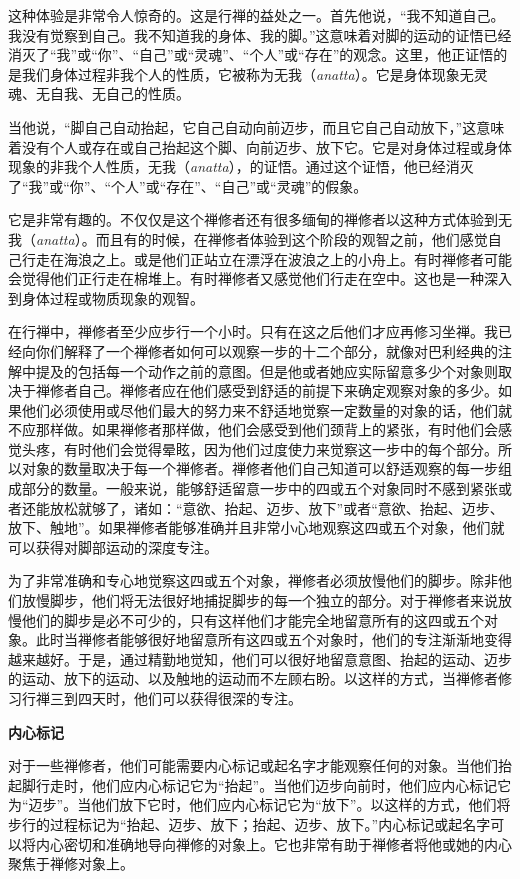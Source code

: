 这种体验是非常令人惊奇的。这是行禅的益处之一。首先他说，“我不知道自己。我没有觉察到自己。我不知道我的身体、我的脚。”这意味着对脚的运动的证悟已经消灭了“我”或“你”、“自己”或“灵魂”、“个人”或“存在”的观念。这里，他正证悟的是我们身体过程非我个人的性质，它被称为无我（{\it anatta}）。它是身体现象无灵魂、无自我、无自己的性质。

当他说，“脚自己自动抬起，它自己自动向前迈步，而且它自己自动放下，”这意味着没有个人或存在或自己抬起这个脚、向前迈步、放下它。它是对身体过程或身体现象的非我个人性质，无我（{\it anatta}），的证悟。通过这个证悟，他已经消灭了“我”或“你”、“个人”或“存在”、“自己”或“灵魂”的假象。

它是非常有趣的。不仅仅是这个禅修者还有很多缅甸的禅修者以这种方式体验到无我（{\it anatta}）。而且有的时候，在禅修者体验到这个阶段的观智之前，他们感觉自己行走在海浪之上。或是他们正站立在漂浮在波浪之上的小舟上。有时禅修者可能会觉得他们正行走在棉堆上。有时禅修者又感觉他们行走在空中。这也是一种深入到身体过程或物质现象的观智。

在行禅中，禅修者至少应步行一个小时。只有在这之后他们才应\1再修习坐禅。我已经向你们解释了一个禅修者如何可以观察一步的十二个部分，就像对巴利经典的注解中提及的包括每一个动作之前的意图。但是他或者她应实际留意多少个对象则取决于禅修者自己。禅修者应在他们感受到舒适的前提下来确定观察对象的多少。如果他们必须使用或尽他们最大的努力来不舒适地觉察一定数量的对象的话，他们就不应那样做。如果禅修者那样做，他们会感受到他们颈背上的紧张，有时他们会感觉头疼，有时他们会觉得晕眩，因为他们过度使力来觉察这一步中的每个部分。所以对象的数量取决于每一个禅修者。禅修者他们自己知道可以舒适观察的每一步组成部分的数量。一般来说，能够舒适留意一步中的四或五个对象同时不感到紧张或者还能放松就够了，诸如：“意欲、抬起、迈步、放下”或者“意欲、抬起、迈步、放下、触地”。如果禅修者能够准确并且非常小心地观察这四或五个对象，他们就可以获得对脚部运动的深度专注。

为了非常准确和专心地觉察这四或五个对象，禅修者必须放慢他们的脚步。除非他们放慢脚步，他们将无法很好地捕捉脚步的每一个独立的部分。对于禅修者来说放慢他们的脚步是必不可少的，只有这样他们才能完全地留意所有的这四或五个对象。此时当禅修者能够很好地留意所有这四或五个对象时，他们的专注渐渐地变得越来越好。于是，通过精勤地觉知，他们可以很好地留意意图、抬起的运动、迈步的运动、放下的运动、以及触地的运动而不左顾右盼。以这样的方式，当禅修者修习行禅\1三到四天时，他们可以获得很深的专注。

{\medbreak\bf 内心标记\smallbreak}

对于一些禅修者，他们可能需要内心标记或起名字才能观察任何的对象。当他们抬起脚行走时，他们应内心标记它为“抬起”。当他们迈步向前时，他们应内心标记它为“迈步”。当他们放下它时，他们应内心标记它为“放下”。以这样的方式，他们将步行的过程标记为“抬起、迈步、放下；抬起、迈步、放下。”内心标记或起名字可以将内心密切和准确地导向禅修的对象上。它也非常有助于禅修者将他或她的内心聚焦于禅修对象上。

